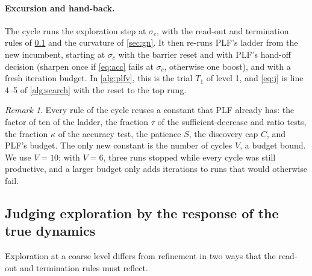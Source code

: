 \documentclass[11pt]{article}
\theoremstyle{remark}
\newtheorem*{remark}{Remark}
\begin{document}
\paragraph{Excursion and hand-back.} The cycle runs the exploration step at $\sigma_c$, with the read-out and termination rules of \cref{sec:readout} and the curvature of \cref{sec:gn}. It then re-runs PLF's ladder from the new incumbent, starting at $\sigma_c$ with the barrier reset and with PLF's hand-off decision (sharpen once if \cref{eq:acc} fails at $\sigma_c$, otherwise one boost), and with a fresh iteration budget. In \cref{alg:plfv}, this is the trial $T_1$ of level 1, and \cref{eq:j} is line 4--5 of \cref{alg:search} with the reset to the top rung.


\begin{remark}
Every rule of the cycle reuses a constant that PLF already has: the factor of ten of the ladder, the fraction $\tau$ of the sufficient-decrease and ratio tests, the fraction $\kappa$ of the accuracy test, the patience $S$, the discovery cap $C$, and PLF's budget. The only new constant is the number of cycles $V$, a budget bound. We use $V = 10$; with $V = 6$, three runs stopped while every cycle was still productive, and a larger budget only adds iterations to runs that would otherwise fail.
\end{remark}

\subsection{Judging exploration by the response of the true dynamics}
\label{sec:readout}

Exploration at a coarse level differs from refinement in two ways that the read-out and termination rules must reflect.
\end{document}
